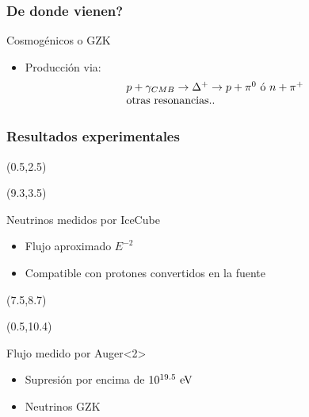 \begin{frame}
 \frametitle{De donde vienen?}
 \begin{block}{Cosmog\'enicos o GZK}
  \begin{itemize}
   \item Producci\'on via:
   \begin{displaymath}
    \begin{array}{l}
		p + \gamma_{CMB} \rightarrow \Delta^{+} \rightarrow p +\pi^{0}\,\,{\rm \acute{o}}\,\, n +\pi^{+} \\
        {\rm otras\,\, resonancias..}
	\end{array}
   \end{displaymath}
  \end{itemize}
 \end{block}
 \vfill
 \begin{center}
 \end{center}
 \vfill
\end{frame}

\begin{frame}
 \frametitle{Resultados experimentales}
 \begin{textblock}{8}(0.5,2.5)
 \end{textblock}
 \begin{textblock}{6}(9.3,3.5)
  \begin{exampleblock}{Neutrinos medidos por IceCube}
   \begin{itemize}
    \item Flujo aproximado $E^{-2}$
    \item Compatible con protones convertidos en la fuente
   \end{itemize}
  \end{exampleblock}
 \end{textblock}

 \begin{textblock}{8}(7.5,8.7)
 \end{textblock}
 
 \begin{textblock}{6}(0.5,10.4)
  \begin{alertblock}{Flujo medido por Auger}<2>
   \begin{itemize}
    \item Supresi\'on por encima de $10^{19.5}{\rm\ eV}$
    \item Neutrinos GZK
   \end{itemize}
  \end{alertblock}
 \end{textblock}
\end{frame}

